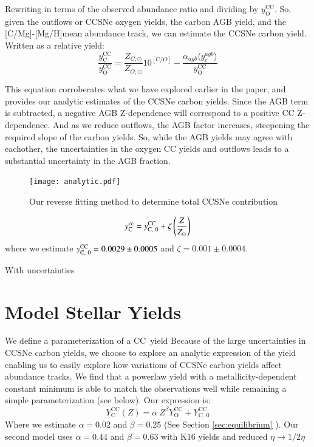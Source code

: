 \documentclass[12pt,oneside]{report}
\newcommand{\caah}{[C/Mg]-[Mg/H]}
\newcommand{\Ycc}{\ensuremath{y_{\rm C}^{\rm cc}}}
\newcommand{\sun}{\ensuremath{\odot}}
\begin{document}
Rewriting in terms of the observed abundance ratio and dividing by
$y_\text{O}^\text{CC}$. So, given the outflows or CCSNe oxygen yields, the
carbon AGB yield, and the \caah mean abundance track, we can estimate the CCSNe carbon yield. Written as a relative yield:
\begin{equation}
    \frac{y_\text{C}^\text{CC}}{y_\text{O}^\text{CC}} = \frac{Z_{C, \sun}}{Z_{O, \sun}} 10^{[C/O]} - \frac{\alpha_{agb} \langle y_c^{agb} \rangle}{ y_\text{O}^\text{CC}}
\end{equation}

This equation corroberates what we have explored earlier in the paper, and provides our analytic estimates of the CCSNe carbon yields. Since the AGB term is subtracted, a negative AGB Z-dependence will correspond to a positive CC Z-dependence. And as we reduce outflows, the AGB factor increases, steepening the required slope of the carbon yields. So, while the AGB yields may agree with eachother, the uncertainties in the oxygen CC yields and outflows leads to a substantial uncertainty in the AGB fraction.  

\begin{figure}
    \centering
    \texttt{[image: analytic.pdf]}
    \caption[Reverse fit yields]{Our reverse fitting method to determine total CCSNe contribution}
\end{figure}

\begin{equation}
    \Ycc = y_{\rm C,~0}^{\rm CC} + \zeta \left(\frac{Z}{Z_\odot}\right)
\end{equation}
where we estimate $y_{\rm C,~0}^{\rm CC} = 0.0029\pm 0.0005$ and $\zeta = 0.001\pm0.0004$.

With uncertainties 

\section{Model Stellar Yields}
We define a parameterization of a CC~yield
  Because of the large uncertainties in CCSNe carbon yields, we choose to explore an analytic expression of the yield enabling us to easily explore how variations of CCSNe carbon yields affect abundance tracks. We find that a powerlaw yield with a metallicity-dependent constant minimum is able to match the observations well while remaining a simple parameterization (see below). Our expression is:
  \begin{equation}\label{eq:y_yields}
   Y_\text{C}^\text{CC}(Z) =  \alpha\ Z^\beta Y_\text{O}^\text{CC} + Y_\text{C, 0}^\text{CC}
    \end{equation}
   	Where we estimate $\alpha = 0.02$ and $\beta = 0.25$ (See Section \ref{sec:equilibrium} ). Our second model uses $\alpha = 0.44$ and $\beta = 0.63$ with K16 yields and reduced $\eta \rightarrow 1/2 \eta$ 
    
\end{document}
